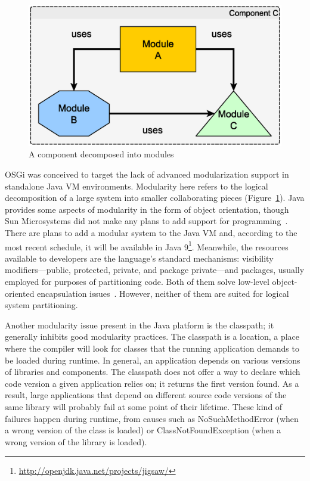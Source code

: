 \begin{figure}[h!]
\centering
\includegraphics[width=.5\textwidth]{figures/modularity.eps}
\caption{A component decomposed into modules}
\label{fig:modularity}
\end{figure}

OSGi was conceived to target the lack of advanced modularization support in
standalone Java VM environments. Modularity here refers to the logical
decomposition of a large system into smaller collaborating pieces
(Figure~\ref{fig:modularity}). Java provides some aspects of modularity in the
form of object orientation, though Sun Microsystems did not make any plans to
add support for programming~\cite{hall2011osgi, castroalves2011osgi}.
There are plans to add a modular system to the Java VM and, according to the
most recent schedule, it will be available in Java
9\footnote{\url{http://openjdk.java.net/projects/jigsaw/}}. Meanwhile,
the resources available to developers are the language's standard mechanisms:
visibility modifiers---public, protected, private, and package private---and packages,
usually employed for purposes of partitioning code. Both of them solve low-level
object-oriented encapsulation issues~\cite{gosling2005java}. However, neither of
them are suited for logical system partitioning.

Another modularity issue present in the Java platform is the classpath; it
generally inhibits good modularity practices. The classpath is a location, a
place where the compiler will look for classes that the running application
demands to be loaded during runtime. In general, an application depends on
various versions of libraries and components. The classpath does not offer a way
to declare which code version a given application relies on; it returns the
first version found. As a result, large applications that depend on different
source code versions of the same library will probably fail at some point of
their lifetime. These kind of failures happen during runtime, from causes such
as NoSuchMethodError (when a wrong version of the class is loaded) or
ClassNotFoundException (when a wrong version of the library is loaded).

